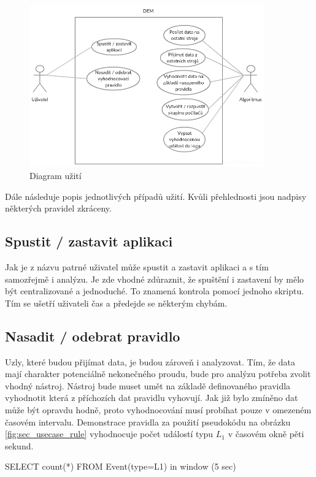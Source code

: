 \documentclass[
  digital, %
  table,   %
  nolof,     %
  nolot,     %
  oneside, %
  nocover,
  monochrome,
  12pt
]{fithesis3}
\begin{document}
\begin{figure}[H]
	\centering
    \includegraphics[width=0.9\textwidth, height=0.45\textheight]{images/usecase.png}
    \caption{Diagram užití}
    \label{fig:usecase}
\end{figure}

Dále následuje popis jednotlivých případů užití. Kvůli přehlednosti jsou nadpisy některých pravidel zkráceny.

\subsection*{Spustit / zastavit aplikaci}
Jak je z názvu patrné uživatel může spustit a zastavit aplikaci a s tím samozřejmě i analýzu. Je zde vhodné zdůraznit, že spuštění i zastavení by mělo být centralizované a jednoduché. To znamená kontrola pomocí jednoho skriptu. Tím se ušetří uživateli čas a předejde se některým chybám.

\subsection*{Nasadit / odebrat pravidlo}
\label{sec:usecase_rule}
Uzly, které budou přijímat data, je budou zároveň i analyzovat. Tím, že data mají charakter potenciálně nekonečného proudu, bude pro analýzu potřeba zvolit vhodný nástroj. Nástroj bude muset umět na základě definovaného pravidla vyhodnotit která z příchozích dat pravidlu vyhovují. Jak již bylo zmíněno dat může být opravdu hodně, proto vyhodnocování musí probíhat pouze v omezeném časovém intervalu. Demonstrace pravidla za použití pseudokódu na obrázku \ref{fig:sec_usecase_rule} vyhodnocuje počet událostí typu \textit{$L_1$} v časovém okně pěti sekund.

\begin{center}
\begin{minipage}[H]{.95\linewidth}
	\begin{mylisting}
SELECT count(*) FROM Event(type=L1) in window (5 sec)
	\end{mylisting}
	\label{fig:sec_usecase_rule} 
\end{minipage}
\end{center}
\end{document}
